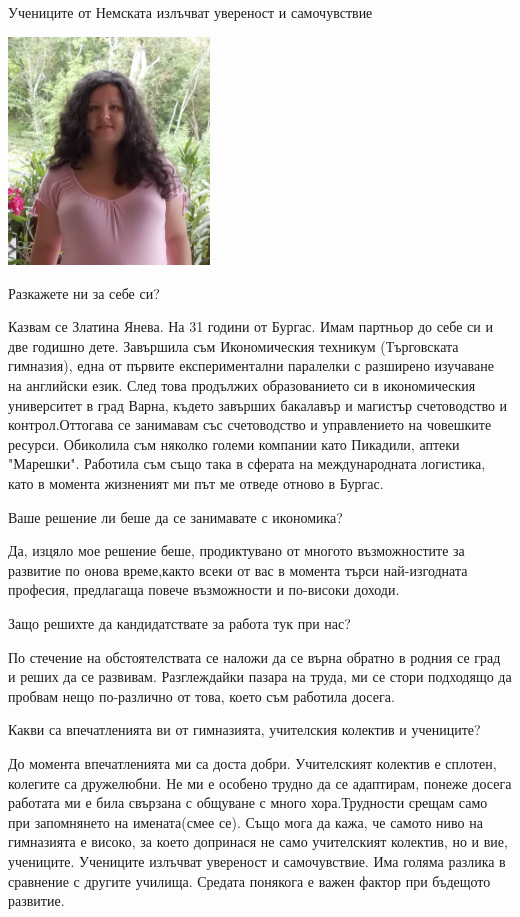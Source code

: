 \begin{multicols}{3}Учениците от Немската излъчват увереност и самочувствие

\noindent \includegraphics[width=2.1in]{./Jneva/Jneva.jpg}

Разкажете ни за себе си?

Казвам се Златина Янева. На 31 години от Бургас. Имам партньор до себе си и две годишно дете. Завършила съм Икономическия техникум (Търговската гимназия), една от първите експериментални паралелки с разширено изучаване на английски език. 
След това продължих образованието си в икономическия университет в град Варна, където завърших бакалавър и магистър счетоводство и контрол.Оттогава се занимавам със счетоводство и управлението на човешките ресурси. Обиколила съм няколко големи компании като Пикадили, аптеки "Марешки". Работила съм също така в сферата на международната логистика, като в момента жизненият ми път ме отведе 
отново в Бургас.

Ваше решение ли беше да се занимавате с икономика?

Да, изцяло мое решение беше, продиктувано от многото възможностите за развитие по онова време,както всеки от вас в момента търси най-изгодната професия, предлагаща повече възможности и по-високи доходи.

Защо решихте да кандидатствате за работа тук при нас?

По стечение на обстоятелствата се наложи да се върна обратно  в родния се град и реших да се развивам. Разглеждайки пазара на труда, ми се стори подходящо да пробвам нещо по-различно от това, което съм работила досега.

Какви са впечатленията ви от гимназията, учителския колектив и учениците?

До момента впечатленията ми са доста добри. Учителският колектив е сплотен, колегите са дружелюбни. Не ми е особено трудно да се адаптирам, понеже досега работата ми е била свързана с общуване с много хора.Трудности срещам само при запомнянето на имената(смее се). Също мога да кажа, че самото ниво на гимназията 
е високо, за което допринася не само учителският колектив, но и вие, учениците. Учениците излъчват увереност и самочувствие. Има голяма разлика в сравнение с другите училища. Средата понякога е важен фактор при бъдещото развитие.


\end{multicols}
